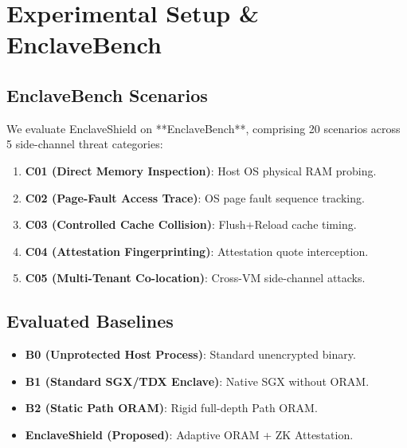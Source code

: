 \section{Experimental Setup & EnclaveBench}
\label{sec:evaluation}

\subsection{EnclaveBench Scenarios}
We evaluate EnclaveShield on **EnclaveBench**, comprising 20 scenarios across 5 side-channel threat categories:
\begin{enumerate}
    \item \textbf{C01 (Direct Memory Inspection)}: Host OS physical RAM probing.
    \item \textbf{C02 (Page-Fault Access Trace)}: OS page fault sequence tracking.
    \item \textbf{C03 (Controlled Cache Collision)}: Flush+Reload cache timing.
    \item \textbf{C04 (Attestation Fingerprinting)}: Attestation quote interception.
    \item \textbf{C05 (Multi-Tenant Co-location)}: Cross-VM side-channel attacks.
\end{enumerate}

\subsection{Evaluated Baselines}
\begin{itemize}
    \item \textbf{B0 (Unprotected Host Process)}: Standard unencrypted binary.
    \item \textbf{B1 (Standard SGX/TDX Enclave)}: Native SGX without ORAM.
    \item \textbf{B2 (Static Path ORAM)}: Rigid full-depth Path ORAM.
    \item \textbf{EnclaveShield (Proposed)}: Adaptive ORAM + ZK Attestation.
\end{itemize}
